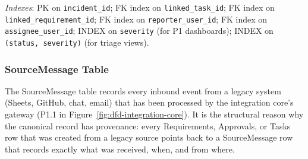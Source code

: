 \documentclass[12pt,a4paper]{report}
\begin{document}
\noindent \emph{Indexes}: PK on \texttt{incident\_id}; FK index on
\texttt{linked\_task\_id}; FK index on \texttt{linked\_requirement\_id}; FK
index on \texttt{reporter\_user\_id}; FK index on \texttt{assignee\_user\_id};
INDEX on \texttt{severity} (for P1 dashboards); INDEX on
\texttt{(status, severity)} (for triage views).

\subsubsection{SourceMessage Table}
\label{tab:sourcemessage}

The SourceMessage table records every inbound event from a legacy system
(Sheets, GitHub, chat, email) that has been processed by the integration
core's gateway (P1.1 in Figure~\ref{fig:dfd-integration-core}). It is the
structural reason why the canonical record has provenance: every Requirements,
Approvals, or Tasks row that was created from a legacy source points back
to a SourceMessage row that records exactly what was received, when, and from
where.
\end{document}
